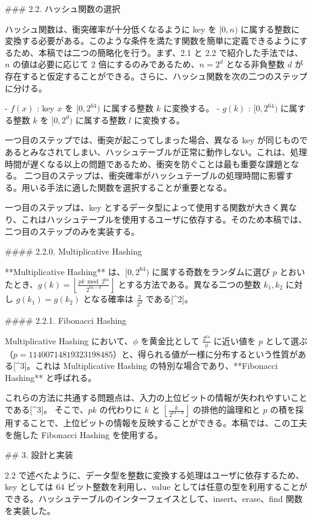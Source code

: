 ### 2.2. ハッシュ関数の選択

ハッシュ関数は、衝突確率が十分低くなるように key を $[0, n)$ に属する整数に変換する必要がある。このような条件を満たす関数を簡単に定義できるようにするため、本稿では二つの簡略化を行う。まず、2.1 と 2.2 で紹介した手法では、$n$ の値は必要に応じて $2$ 倍にするのみであるため、$n = 2^d$ となる非負整数 $d$ が存在すると仮定することができる。さらに、ハッシュ関数を次の二つのステップに分ける。

- $f(x)$ : key $x$ を $[0, 2^{64})$ に属する整数 $k$ に変換する。
- $g(k)$ : $[0, 2^{64})$ に属する整数 $k$ を $[0, 2^d)$ に属する整数 $l$ に変換する。

一つ目のステップでは、衝突が起こってしまった場合、異なる key が同じものであるとみなされてしまい、ハッシュテーブルが正常に動作しない。これは、処理時間が遅くなる以上の問題であるため、衝突を防ぐことは最も重要な課題となる。
二つ目のステップは、衝突確率がハッシュテーブルの処理時間に影響する。用いる手法に適した関数を選択することが重要となる。

一つ目のステップは、key とするデータ型によって使用する関数が大きく異なり、これはハッシュテーブルを使用するユーザに依存する。そのため本稿では、二つ目のステップのみを実装する。

#### 2.2.0. Multiplicative Hashing

**Multiplicative Hashing** は、$[0, 2^{64})$ に属する奇数をランダムに選び $p$ とおいたとき、$\displaystyle g(k) = \left\lfloor \frac{pk \bmod 2^{64}}{2^{64-d}} \right\rfloor$ とする方法である。異なる二つの整数 $k_1, k_2$ に対し $g(k_1) = g(k_2)$ となる確率は $\displaystyle \frac{2}{2^d}$ である[^2]。

#### 2.2.1. Fibonacci Hashing

Multiplicative Hashing において、$\phi$ を黄金比として $\displaystyle \frac{2^{64}}{\phi}$ に近い値を $p$ として選ぶ（$p = 11400714819323198485$）と、得られる値が一様に分布するという性質がある[^3]。これは Multiplicative Hashing の特別な場合であり、**Fibonacci Hashing** と呼ばれる。

これらの方法に共通する問題点は、入力の上位ビットの情報が失われやすいことである[^3]。
そこで、$pk$ の代わりに $k$ と $\displaystyle \left\lfloor \frac{k}{2^{64-d}} \right\rfloor$ の排他的論理和と $p$ の積を採用することで、上位ビットの情報を反映することができる。本稿では、この工夫を施した Fibonacci Hashing を使用する。

## 3. 設計と実装

2.2 で述べたように、データ型を整数に変換する処理はユーザに依存するため、key としては $64$ ビット整数を利用し、value としては任意の型を利用することができる。ハッシュテーブルのインターフェイスとして、insert、erase、find 関数を実装した。

